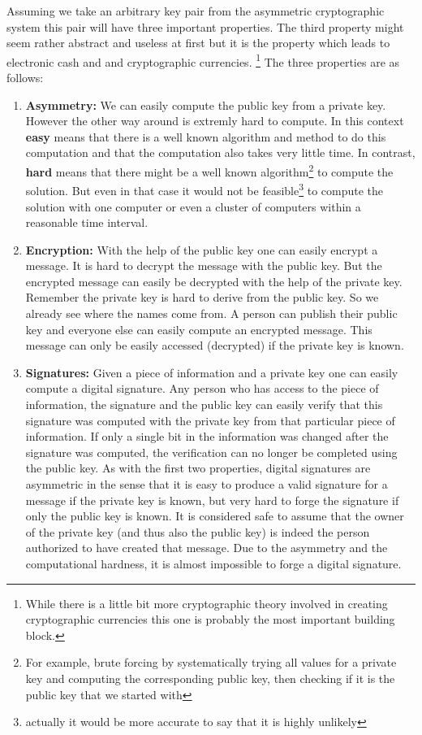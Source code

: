 \documentclass[a4paper,12pt,oneside,openany]{book}
\begin{document}
Assuming we take an arbitrary key pair from the asymmetric cryptographic system this pair will have three important properties.
The third property might seem rather abstract and useless at first but it is the property which leads to electronic cash and and cryptographic currencies. \footnote{While there is a little bit more cryptographic theory involved in creating cryptographic currencies this one is probably the most important building block.}
The three properties are as follows:
\begin{enumerate}
\item \textbf{Asymmetry:} We can easily compute the public key from a private key.
However the other way around is extremly hard to compute.
In this context \textbf{\gls{easy}} means that there is a well known algorithm and method to do this computation and that the computation also takes very little time.
In contrast, \textbf{\gls{hard}} means that there might be a well known algorithm\footnote{For example, brute forcing by systematically trying all values for a private key and computing the corresponding public key, then checking if it is the public key that we started with} to compute the solution.
But even in that case it would not be feasible\footnote{actually it would be more accurate to say that it is highly  unlikely} to compute the solution with one computer or even a cluster of computers within a reasonable time interval.
\item \textbf{Encryption:} With the help of the public key one can easily encrypt a message.
It is hard to decrypt the message with the public key.
But the encrypted message can easily be decrypted with the help of the private key.
Remember the private key is hard to derive from the public key.
So we already see where the names come from.
A person can publish their public key and everyone else can easily compute an encrypted message.
This message can only be easily accessed (decrypted) if the private key is known.
\item \textbf{Signatures:} Given a piece of information and a private key one can easily compute a digital signature.
  Any person who has access to the piece of information, the signature and the public key can easily verify that this signature was computed with the private key from that particular piece of information.
  If only a single bit in the information was changed after the signature was computed, the verification can no longer be completed using the public key.
  As with the first two properties, digital signatures are asymmetric in the sense that it is easy to produce a valid signature for a message if the private key is known, but very hard to forge the signature if only the public key is known.
  It is considered safe to assume that the owner of the private key (and thus also the public key) is indeed the person authorized to have created that message.
  Due to the asymmetry and the computational hardness, it is almost impossible to forge a digital signature.
\end{enumerate}
\end{document}

